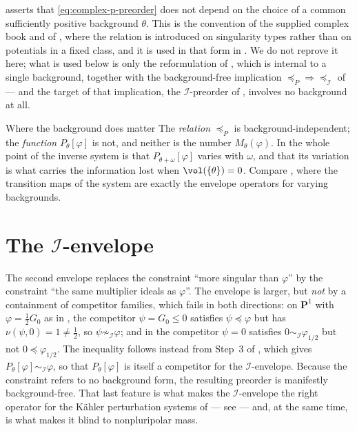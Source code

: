 \begin{remark}
\label{rem:ch51-p-preorder-background}
 asserts that
\eqref{eq:complex-p-preorder} does not depend on the choice of a common
sufficiently positive background \(\theta\).  This is the convention of
the supplied complex book and of \cite{DDNLmetric,DDNLsurv}, where the
relation is introduced on singularity types rather than on potentials in
a fixed class, and it is used in that form in
.  We do not
reprove it here; what is used below is only the reformulation of
, which is internal to a single
background, together with the background-free implication
\(\preceq_P\Rightarrow\preceq_{\mathcal I}\) of
 --- and the target of that
implication, the \(\mathcal I\)-preorder of
, involves no background at all.
\end{remark}

\begin{warning}{Where the background does matter}
\label{warn:ch51-background}
The \emph{relation} \(\preceq_P\) is background-independent; the
\emph{function} \(P_\theta[\varphi]\) is not, and neither is the
number \(M_\theta(\varphi)\).  In
 the whole point of the inverse system
is that \(P_{\theta+\omega}[\varphi]\) varies with \(\omega\), and that
its variation is what carries the information lost when
\(\vol(\{\theta\})=0\).  Compare
, where the transition maps of the
system are exactly the envelope operators for varying backgrounds.
\end{warning}

\section{The \texorpdfstring{\(\mathcal I\)}{I}-envelope}
\label{sec:ch51-i-envelope}

The second envelope replaces the constraint ``more singular than
\(\varphi\)'' by the constraint ``the same multiplier ideals as
\(\varphi\)''.  The envelope is larger, but \emph{not} by a containment of
competitor families, which fails in both directions: on \(\mathbf P^1\)
with \(\varphi=\tfrac12G_0\) as in , the
competitor \(\psi=G_0\leq0\) satisfies \(\psi\preceq\varphi\) but has
\(\nu(\psi,0)=1\neq\tfrac12\), so \(\psi\not\sim_{\mathcal I}\varphi\);
and in  the competitor \(\psi=0\) satisfies
\(0\sim_{\mathcal I}\varphi_{1/2}\) but not \(0\preceq\varphi_{1/2}\).  The
inequality follows instead from Step~3 of
, which gives
\(P_\theta[\varphi]\sim_{\mathcal I}\varphi\), so that
\(P_\theta[\varphi]\) is itself a competitor for the
\(\mathcal I\)-envelope.  Because the constraint refers to no background
form, the resulting
preorder is manifestly background-free.  That last feature is what makes
the \(\mathcal I\)-envelope the right operator for the K\"ahler
perturbation systems of  --- see
 --- and, at the same time, is what
makes it blind to nonpluripolar mass.

